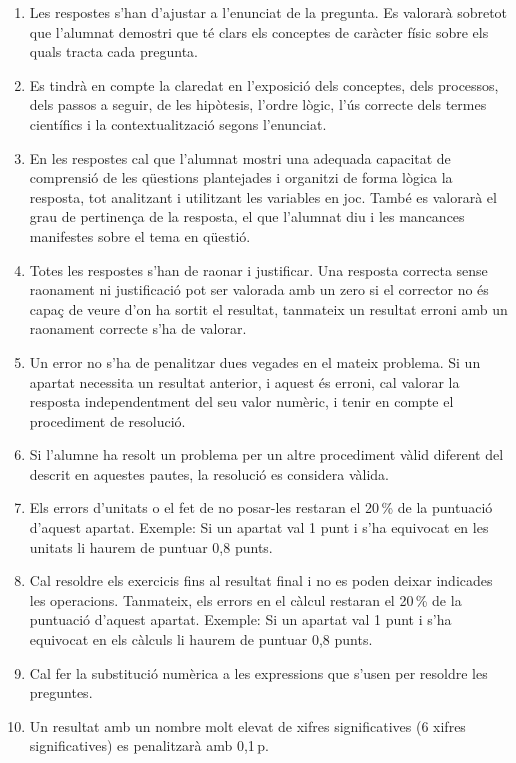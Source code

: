 \begin{enumerate}
  \item Les respostes s'han d'ajustar a l'enunciat de la pregunta. Es valorarà sobretot que l'alumnat demostri que té clars els conceptes de caràcter físic sobre els quals tracta cada pregunta.
  \item Es tindrà en compte la claredat en l'exposició dels conceptes, dels processos, dels passos a seguir, de les hipòtesis, l'ordre lògic, l'ús correcte dels termes científics i la contextualització segons l'enunciat.
  \item En les respostes cal que l'alumnat mostri una adequada capacitat de comprensió de les qüestions plantejades i organitzi de forma lògica la resposta, tot analitzant i utilitzant les variables en joc. També es valorarà el grau de pertinença de la resposta, el que l'alumnat diu i les mancances manifestes sobre el tema en qüestió.
  \item Totes les respostes s'han de raonar i justificar. Una resposta correcta sense raonament ni justificació pot ser valorada amb un zero si el corrector no és capaç de veure d'on ha sortit el resultat, tanmateix un resultat erroni amb un raonament correcte s'ha de valorar.
  \item Un error no s'ha de penalitzar dues vegades en el mateix problema. Si un apartat necessita un resultat anterior, i aquest és erroni, cal valorar la resposta independentment del seu valor numèric, i tenir en compte el procediment de resolució.
  \item Si l'alumne ha resolt un problema per un altre procediment vàlid diferent del descrit en aquestes pautes, la resolució es considera vàlida.
  \item Els errors d'unitats o el fet de no posar-les restaran el 20\,\% de la puntuació d'aquest apartat. Exemple: Si un apartat val 1 punt i s'ha equivocat en les unitats li haurem de puntuar 0,8 punts.
  \item Cal resoldre els exercicis fins al resultat final i no es poden deixar indicades les operacions. Tanmateix, els errors en el càlcul restaran el 20\,\% de la puntuació d'aquest apartat. Exemple: Si un apartat val 1 punt i s'ha equivocat en els càlculs li haurem de puntuar 0,8 punts.
  \item Cal fer la substitució numèrica a les expressions que s'usen per resoldre les preguntes.
  \item Un resultat amb un nombre molt elevat de xifres significatives (6 xifres significatives) es penalitzarà amb 0,1\,p.
\end{enumerate}
